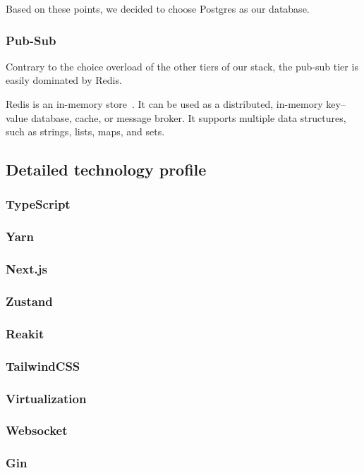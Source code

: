 Based on these points, we decided to choose Postgres as our database.

\subsubsection{Pub-Sub}

Contrary to the choice overload of the other tiers of our stack, the pub-sub tier is easily dominated by Redis.

Redis is an in-memory store~\autocite{noauthor_faq_nodate}. It can be used as a distributed, in-memory key–value database, cache, or message broker. It supports multiple data structures, such as strings, lists, maps, and sets.

\subsection{Detailed technology profile}

\subsubsection{TypeScript}
\subsubsection{Yarn}
\subsubsection{Next.js}
\subsubsection{Zustand}
\subsubsection{Reakit}
\subsubsection{TailwindCSS}
\subsubsection{Virtualization}
\subsubsection{Websocket}
\subsubsection{Gin}
